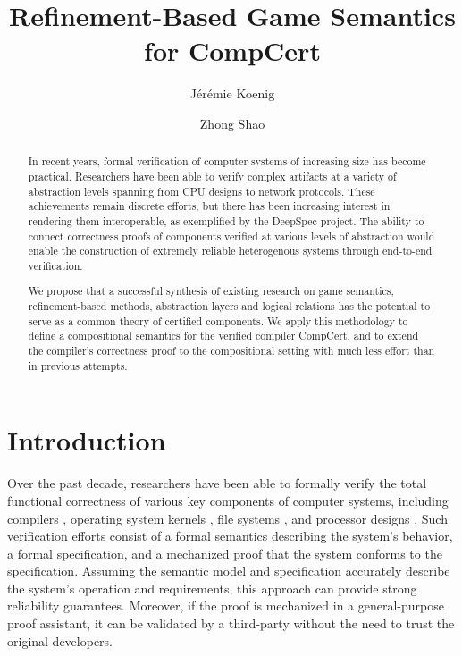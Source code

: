 \documentclass[acmsmall,timestamp,review,anonymous]{acmart}
\title{Refinement-Based Game Semantics for CompCert}
\author{J\'er\'emie Koenig}
\affiliation{Yale University}
\author{Zhong Shao}
\affiliation{Yale University}
\begin{document}
\begin{abstract} %
In recent years,
formal verification of computer systems
of increasing size has become practical.
Researchers have been able to verify complex artifacts
at a variety of abstraction levels spanning
from CPU designs to network protocols.
These achievements remain discrete efforts, but
there has been increasing interest in rendering them interoperable,
as exemplified by the DeepSpec project.
The ability to connect correctness proofs of components
verified at various levels of abstraction
would enable the construction of extremely reliable heterogenous systems
through end-to-end verification.

We propose that a successful synthesis of existing research on
game semantics,
refinement-based methods,
abstraction layers and
logical relations
has the potential to serve as a common theory
of certified components.
We apply this methodology to define
a compositional semantics for the verified compiler
CompCert,
and to extend
the compiler's correctness proof
to the compositional setting
with much less effort than in previous attempts.
\end{abstract}

\maketitle

\section{Introduction} %


Over the past decade,
researchers have been able to formally verify the
total functional correctness
of various key components of computer systems,
including
compilers \cite{compcert, vellvm},
operating system kernels \cite{sel4, popl15},
file systems \cite{fscq}, and
processor designs \cite{safe}.
Such verification efforts
consist of
a formal semantics describing the system's behavior,
a formal specification,
and a mechanized proof that
the system conforms to the specification.
Assuming the semantic model and specification accurately describe
the system's operation and requirements,
this approach can provide
strong reliability guarantees.
Moreover,
if the proof is mechanized in a general-purpose proof assistant,
it can be validated by a third-party
without the need to trust the original developers.

\end{document}
